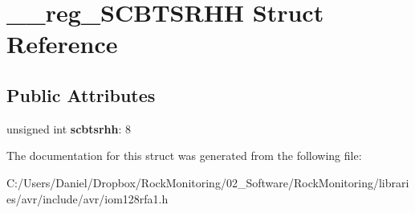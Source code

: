 \hypertarget{struct____reg___s_c_b_t_s_r_h_h}{}\section{\+\_\+\+\_\+reg\+\_\+\+S\+C\+B\+T\+S\+R\+HH Struct Reference}
\label{struct____reg___s_c_b_t_s_r_h_h}
\subsection*{Public Attributes}
\begin{DoxyCompactItemize}
\item 
unsigned int {\bfseries scbtsrhh}\+: 8\hypertarget{struct____reg___s_c_b_t_s_r_h_h_af1bd42863dff0c0e13ce40c26ade2968}{}\label{struct____reg___s_c_b_t_s_r_h_h_af1bd42863dff0c0e13ce40c26ade2968}

\end{DoxyCompactItemize}


The documentation for this struct was generated from the following file\+:\begin{DoxyCompactItemize}
\item 
C\+:/\+Users/\+Daniel/\+Dropbox/\+Rock\+Monitoring/02\+\_\+\+Software/\+Rock\+Monitoring/libraries/avr/include/avr/iom128rfa1.\+h\end{DoxyCompactItemize}

